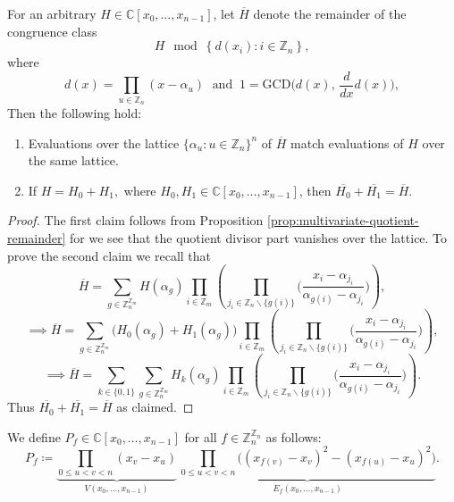  \begin{proposition}\label{prop:ring-homomorphism}
For an arbitrary $H\in\mathbb{C}\left[x_{0},\ldots,x_{n-1}\right]$, let $\overline{H}$ denote
the {remainder} of the congruence class 
\[
H\mod\left\{ d(x_{i}):i\in\mathbb{Z}_{n}\right\} ,
\]
where
\[
d(x)=\prod_{u\in\mathbb{Z}_{n}}(x-\alpha_{u})\;\text{ and }\:1=\text{GCD}\big(d(x),\,\frac{d}{dx}d(x)\big),
\]
Then the following hold:
\begin{enumerate}
    \item Evaluations over the  lattice $\{\alpha_{u}:u\in\mathbb{Z}_{n}\}^{n}$ of $\overline{H}$ match evaluations of $H$ over the same lattice. 
    \item If $H = H_0 + H_1,$ where $H_0, H_1 \in \mathbb{C}\left[x_{0},\ldots,x_{n-1}\right]$, then $\overline{H_0} + \overline{H_1} = \overline{H}$.
\end{enumerate}
 \end{proposition}
\begin{proof}
  The first claim follows from Proposition \ref{prop:multivariate-quotient-remainder} for we see that the quotient divisor part vanishes over the lattice. To prove the second claim we recall that
  \[
\overline{H}=\sum_{g\in\mathbb{Z}_{n}^{\mathbb{Z}_{m}}}H(\alpha_{g})\prod_{i\in\mathbb{Z}_{m}}\left(\prod_{j_{i}\in\mathbb{Z}_{n}\backslash\{g(i)\}}\bigg(\frac{x_{i}-\alpha_{j_{i}}}{\alpha_{g(i)}-\alpha_{j_{i}}}\bigg)\right),
  \]
  \[
  \implies\overline{H}=\sum_{g\in\mathbb{Z}_{n}^{\mathbb{Z}_{m}}}\big(H_{0}(\alpha_{g})+H_{1}(\alpha_{g})\big)\prod_{i\in\mathbb{Z}_{m}}\left(\prod_{j_{i}\in\mathbb{Z}_{n}\backslash\{g(i)\}}\bigg(\frac{x_{i}-\alpha_{j_{i}}}{\alpha_{g(i)}-\alpha_{j_{i}}}\bigg)\right),
  \]
  \[
  \implies\overline{H}=\sum_{k\in\{0,1\}}\sum_{g\in\mathbb{Z}_{n}^{\mathbb{Z}_{m}}}H_{k}(\alpha_{g})\prod_{i\in\mathbb{Z}_{m}}\left(\prod_{j_{i}\in\mathbb{Z}_{n}\backslash\{g(i)\}}\bigg(\frac{x_{i}-\alpha_{j_{i}}}{\alpha_{g(i)}-\alpha_{j_{i}}}\bigg)\right).
  \]
  Thus $\overline{H_0} + \overline{H_1} = \overline{H}$ as claimed.
\end{proof}
\begin{defn}\label{defn:polynomial-grace-definition} We define $P_f \in \mathbb{C}[x_0, \ldots, x_{n-1}]$ for all $f \in \mathbb{Z}_n^{\mathbb{Z}_n}$ as follows:
\begin{equation}
    P_f \coloneq \underbrace{\prod_{0\le u<v<n}(x_{v}-x_{u})}_{V(x_0,\ldots,x_{n-1})}\,\underbrace{\prod_{0\le u<v<n}\big((x_{f(v)}-x_{v})^{2}-(x_{f(u)}-x_{u})^{2}\big)}_{E_f(x_0,\ldots,x_{n-1})}.
\end{equation}
\end{defn}
